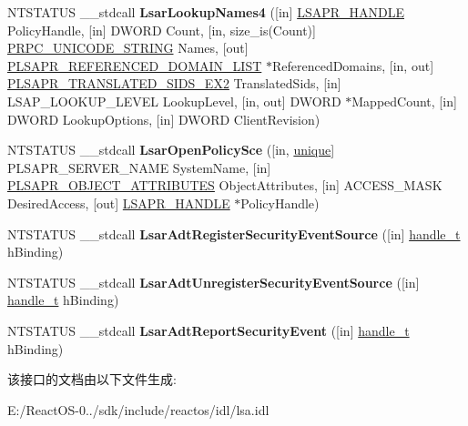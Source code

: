 \begin{DoxyCompactItemize}
\item 
\mbox{\label{interfacelsarpc_ac42ca5806d0c351188589a812feb8b53}} 
N\+T\+S\+T\+A\+T\+US \+\_\+\+\_\+stdcall {\bfseries Lsar\+Lookup\+Names4} (\mbox{[}in\mbox{]} \hyperlink{interfacevoid}{L\+S\+A\+P\+R\+\_\+\+H\+A\+N\+D\+LE} Policy\+Handle, \mbox{[}in\mbox{]} D\+W\+O\+RD Count, \mbox{[}in, size\+\_\+is(Count)\mbox{]} \hyperlink{struct___r_p_c___u_n_i_c_o_d_e___s_t_r_i_n_g}{P\+R\+P\+C\+\_\+\+U\+N\+I\+C\+O\+D\+E\+\_\+\+S\+T\+R\+I\+NG} Names, \mbox{[}out\mbox{]} \hyperlink{struct___l_s_a_p_r___r_e_f_e_r_e_n_c_e_d___d_o_m_a_i_n___l_i_s_t}{P\+L\+S\+A\+P\+R\+\_\+\+R\+E\+F\+E\+R\+E\+N\+C\+E\+D\+\_\+\+D\+O\+M\+A\+I\+N\+\_\+\+L\+I\+ST} $\ast$Referenced\+Domains, \mbox{[}in, out\mbox{]} \hyperlink{struct___l_s_a_p_r___t_r_a_n_s_l_a_t_e_d___s_i_d_s___e_x2}{P\+L\+S\+A\+P\+R\+\_\+\+T\+R\+A\+N\+S\+L\+A\+T\+E\+D\+\_\+\+S\+I\+D\+S\+\_\+\+E\+X2} Translated\+Sids, \mbox{[}in\mbox{]} L\+S\+A\+P\+\_\+\+L\+O\+O\+K\+U\+P\+\_\+\+L\+E\+V\+EL Lookup\+Level, \mbox{[}in, out\mbox{]} D\+W\+O\+RD $\ast$Mapped\+Count, \mbox{[}in\mbox{]} D\+W\+O\+RD Lookup\+Options, \mbox{[}in\mbox{]} D\+W\+O\+RD Client\+Revision)
\item 
\mbox{\label{interfacelsarpc_a87f7a539026bf0fc38c10ebfc458453b}} 
N\+T\+S\+T\+A\+T\+US \+\_\+\+\_\+stdcall {\bfseries Lsar\+Open\+Policy\+Sce} (\mbox{[}in, \hyperlink{interfaceunique}{unique}\mbox{]} P\+L\+S\+A\+P\+R\+\_\+\+S\+E\+R\+V\+E\+R\+\_\+\+N\+A\+ME System\+Name, \mbox{[}in\mbox{]} \hyperlink{struct___l_s_a_p_r___o_b_j_e_c_t___a_t_t_r_i_b_u_t_e_s}{P\+L\+S\+A\+P\+R\+\_\+\+O\+B\+J\+E\+C\+T\+\_\+\+A\+T\+T\+R\+I\+B\+U\+T\+ES} Object\+Attributes, \mbox{[}in\mbox{]} A\+C\+C\+E\+S\+S\+\_\+\+M\+A\+SK Desired\+Access, \mbox{[}out\mbox{]} \hyperlink{interfacevoid}{L\+S\+A\+P\+R\+\_\+\+H\+A\+N\+D\+LE} $\ast$Policy\+Handle)
\item 
\mbox{\label{interfacelsarpc_a5dd1aba5271d25431922c298bce610c2}} 
N\+T\+S\+T\+A\+T\+US \+\_\+\+\_\+stdcall {\bfseries Lsar\+Adt\+Register\+Security\+Event\+Source} (\mbox{[}in\mbox{]} \hyperlink{interfacevoid}{handle\+\_\+t} h\+Binding)
\item 
\mbox{\label{interfacelsarpc_a9eca9ccb4eaa99356591f414b607e841}} 
N\+T\+S\+T\+A\+T\+US \+\_\+\+\_\+stdcall {\bfseries Lsar\+Adt\+Unregister\+Security\+Event\+Source} (\mbox{[}in\mbox{]} \hyperlink{interfacevoid}{handle\+\_\+t} h\+Binding)
\item 
\mbox{\label{interfacelsarpc_a47fb4da8837de1ba51b35d99dd6bbe92}} 
N\+T\+S\+T\+A\+T\+US \+\_\+\+\_\+stdcall {\bfseries Lsar\+Adt\+Report\+Security\+Event} (\mbox{[}in\mbox{]} \hyperlink{interfacevoid}{handle\+\_\+t} h\+Binding)
\end{DoxyCompactItemize}


该接口的文档由以下文件生成\+:\begin{DoxyCompactItemize}
\item 
E\+:/\+React\+O\+S-\/0../sdk/include/reactos/idl/lsa.\+idl\end{DoxyCompactItemize}
